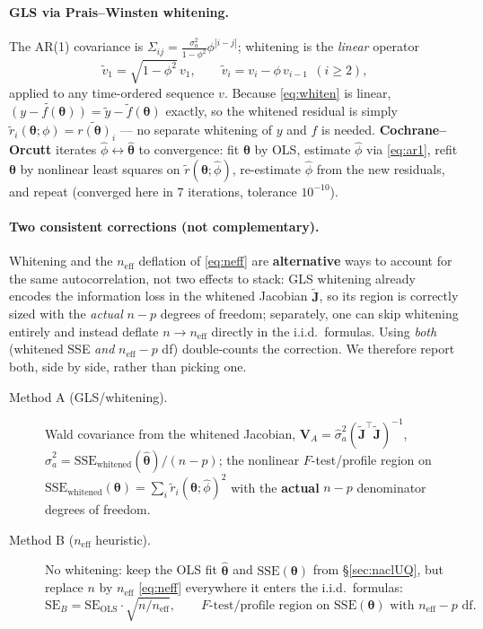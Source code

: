 \documentclass[11pt]{article}
\newcommand{\SSE}{\mathrm{SSE}}
\begin{document}
\paragraph{GLS via Prais--Winsten whitening.} The AR(1) covariance is
$\Sigma_{ij}=\frac{\sigma_a^2}{1-\phi^2}\phi^{|i-j|}$; whitening is the
\emph{linear} operator
\begin{equation}
  \tilde v_1=\sqrt{1-\phi^2}\,v_1, \qquad \tilde v_i = v_i-\phi\,v_{i-1}\ \ (i\ge2),
  \label{eq:whiten}
\end{equation}
applied to any time-ordered sequence $v$. Because \eqref{eq:whiten} is linear,
$\widetilde{(y-f(\boldsymbol\theta))}=\tilde y-\tilde f(\boldsymbol\theta)$ exactly, so the
whitened residual is simply $\tilde r_i(\boldsymbol\theta;\phi)=\widetilde{r(\boldsymbol\theta)}_i$
--- no separate whitening of $y$ and $f$ is needed. \textbf{Cochrane--Orcutt}
iterates $\hat\phi\leftrightarrow\hat{\boldsymbol\theta}$ to convergence: fit
$\boldsymbol\theta$ by OLS, estimate $\hat\phi$ via \eqref{eq:ar1}, refit
$\boldsymbol\theta$ by nonlinear least squares on $\tilde r(\boldsymbol\theta;\hat\phi)$,
re-estimate $\hat\phi$ from the new residuals, and repeat (converged here in 7
iterations, tolerance $10^{-10}$).
\paragraph{Two consistent corrections (not complementary).} Whitening and the
$n_{\mathrm{eff}}$ deflation of \eqref{eq:neff} are \textbf{alternative} ways to
account for the same autocorrelation, not two effects to stack: GLS whitening
already encodes the information loss in the whitened Jacobian
$\tilde{\mathbf J}$, so its region is correctly sized with the \emph{actual}
$n-p$ degrees of freedom; separately, one can skip whitening entirely and
instead deflate $n\to n_{\mathrm{eff}}$ directly in the i.i.d.\ formulas. Using
\emph{both} (whitened SSE \emph{and} $n_{\mathrm{eff}}-p$ df) double-counts the
correction. We therefore report both, side by side, rather than picking one.
\begin{description}
\item[Method A (GLS/whitening).] Wald covariance from the whitened Jacobian,
  $\mathbf V_A=\hat\sigma_a^2(\tilde{\mathbf J}^\top\tilde{\mathbf J})^{-1}$,
  $\hat\sigma_a^2=\SSE_{\text{whitened}}(\hat{\boldsymbol\theta})/(n-p)$; the
  nonlinear $F$-test/profile region on
  $\SSE_{\text{whitened}}(\boldsymbol\theta)=\sum_i\tilde r_i(\boldsymbol\theta;\hat\phi)^2$
  with the \textbf{actual} $n-p$ denominator degrees of freedom.
\item[Method B ($n_{\mathrm{eff}}$ heuristic).] No whitening: keep the OLS fit
  $\hat{\boldsymbol\theta}$ and $\SSE(\boldsymbol\theta)$ from \S\ref{sec:naclUQ}, but
  replace $n$ by $n_{\mathrm{eff}}$ \eqref{eq:neff} everywhere it enters the
  i.i.d.\ formulas:
  \begin{equation}
    \mathrm{SE}_B = \mathrm{SE}_{\text{OLS}}\cdot\sqrt{n/n_{\mathrm{eff}}}, \qquad
    F\text{-test/profile region on }\SSE(\boldsymbol\theta)\text{ with }n_{\mathrm{eff}}-p\text{ df}.
    \label{eq:methodb}
  \end{equation}
\end{description}
\end{document}
